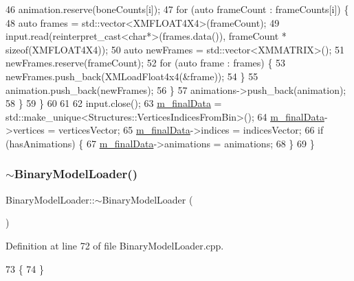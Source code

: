\begin{DoxyCode}
46             animation.reserve(boneCounts[i]);
47             \textcolor{keywordflow}{for} (\textcolor{keyword}{auto} frameCount : frameCounts[i]) \{
48                 \textcolor{keyword}{auto} frames = std::vector<XMFLOAT4X4>(frameCount);
49                 input.read(reinterpret\_cast<char*>(frames.data()), frameCount * \textcolor{keyword}{sizeof}(XMFLOAT4X4));
50                 \textcolor{keyword}{auto} newFrames = std::vector<XMMATRIX>();
51                 newFrames.reserve(frameCount);
52                 \textcolor{keywordflow}{for} (\textcolor{keyword}{auto} frame : frames) \{
53                     newFrames.push\_back(XMLoadFloat4x4(&frame));
54                 \}
55                 animation.push\_back(newFrames);
56             \}
57             animations->push\_back(animation);
58         \}
59     \}
60 
61 
62     input.close();
63     \mbox{\hyperlink{class_binary_model_loader_ad91d8149dfde26ed2949bd05b854974a}{m\_finalData}} = std::make\_unique<Structures::VerticesIndicesFromBin>();
64     \mbox{\hyperlink{class_binary_model_loader_ad91d8149dfde26ed2949bd05b854974a}{m\_finalData}}->vertices = verticesVector;
65     \mbox{\hyperlink{class_binary_model_loader_ad91d8149dfde26ed2949bd05b854974a}{m\_finalData}}->indices = indicesVector;
66     \textcolor{keywordflow}{if} (hasAnimations) \{
67         \mbox{\hyperlink{class_binary_model_loader_ad91d8149dfde26ed2949bd05b854974a}{m\_finalData}}->animations = animations;
68     \}
69 \}
\end{DoxyCode}
\mbox{\label{class_binary_model_loader_a68575fb4ad2b9dd0dc8845518917b2de}} 
\subsubsection{\texorpdfstring{$\sim$\+Binary\+Model\+Loader()}{~BinaryModelLoader()}}
{\footnotesize\ttfamily Binary\+Model\+Loader\+::$\sim$\+Binary\+Model\+Loader (\begin{DoxyParamCaption}{ }\end{DoxyParamCaption})}



Definition at line 72 of file Binary\+Model\+Loader.\+cpp.


\begin{DoxyCode}
73 \{
74 \}
\end{DoxyCode}


